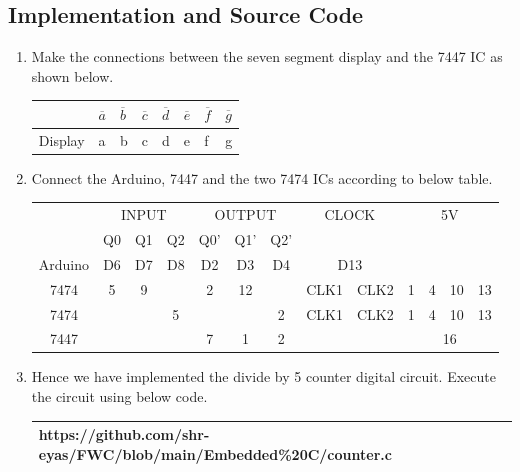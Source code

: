 \documentclass[journal,10pt]{article}
\begin{document}
\subsection{Implementation and Source Code}
\vspace{10pt}
\begin{enumerate}[label=\alph*.,labelindent=\parindent,leftmargin=*]

    \item Make the connections between the seven segment display and the 7447 IC as shown below. 
    \begin{table}[htbp]
      \centering
      \begin{tabular}{|>{\centering\arraybackslash}m{2cm}|*{7}{>{\centering\arraybackslash}m{1cm}|}}
        \hline
        7447 & $\overline{a}$ & $\overline{b}$ & $\overline{c}$ & $\overline{d}$ & $\overline{e}$ & $\overline{f}$ & $\overline{g}$ \\
        \hline
        Display & a & b & c & d & e & f & g \\
        \hline
      \end{tabular}
      \label{tab:sample}
    \end{table}

    \item Connect the Arduino, 7447 and the two 7474 ICs according to below table.
    \begin{table}[htbp]
      \centering
      \begin{tabular}{|c|c|c|c|c|c|c|c|c|c|c|c|c|}
        \hline
        \multirow{2}{*}{} & \multicolumn{3}{c|}{INPUT} & \multicolumn{3}{c|}{OUTPUT} & \multicolumn{2}{c|}{CLOCK} & \multicolumn{4}{c|}{5V}\\
        \cline{2-7}
         & Q0 & Q1 & Q2 & Q0' & Q1' & Q2' & \multicolumn{2}{c|}{} & \multicolumn{4}{c|}{} \\
        \hline        
        Arduino & D6 & D7 & D8 & D2 & D3 & D4 & \multicolumn{2}{c|}{D13} & \multicolumn{4}{c|}{}\\
        \hline
        7474 & 5 & 9 & {} & 2 & 12 & {} & CLK1 & CLK2 & 1 & 4 & 10 & 13\\
        \hline
        7474 & {} & {} & 5 & {} & {} & 2 & CLK1 & CLK2 & 1 & 4 & 10 & 13\\
        \hline
        7447 & \multicolumn{3}{c|}{} & 7 & 1 & 2 & & & \multicolumn{4}{c|}{16}\\
        \hline 
      \end{tabular}
      \label{tab:merge-cells}
    \end{table}

    \item Hence we have implemented the divide by 5 counter digital circuit. Execute the circuit using below code. \vspace{10pt} \\
    \begin{tabularx}{0.8\textwidth} { 
    | >{\centering\arraybackslash}X |}
    \hline
    https://github.com/shr-eyas/FWC/blob/main/Embedded\%20C/counter.c\\
    \hline
    \end{tabularx} \\
\end{enumerate}
\end{document}
